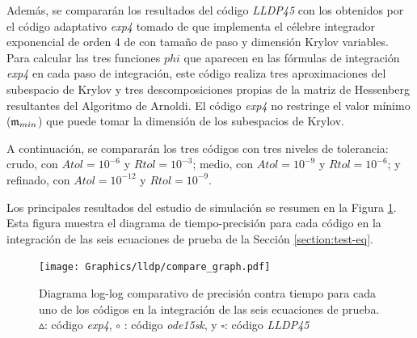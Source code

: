 Además, se compararán los resultados del código \emph{LLDP45} con los obtenidos por el código adaptativo \emph{exp4} tomado de \cite{jansing2011expode} que implementa el célebre integrador exponencial de orden 4 de \cite{hochbruck1998exponential} con tamaño de paso y dimensión Krylov variables. Para calcular las tres funciones $phi$ que aparecen en las fórmulas de integración \emph{exp4} en cada paso de integración, este código realiza tres aproximaciones del subespacio de Krylov y tres descomposiciones propias de la matriz de Hessenberg resultantes del Algoritmo de Arnoldi. El código \emph{exp4} no restringe el
valor mínimo ($\mathfrak{m}_{min}$) que puede tomar la dimensión de los subespacios de Krylov.

A continuación, se compararán los tres códigos con tres niveles de tolerancia: crudo, con $ Atol = 10^{-6}$ y $Rtol = 10^{-3}$; medio, con $Atol = 10^{-9}$ y $Rtol = 10^{-6}$; y refinado, con $ Atol = 10^{-12}$ y $Rtol = 10^{-9}$.

Los principales resultados del estudio de simulación se resumen en la Figura \ref{num-exp-lldp-var-step:Fig1}. Esta figura muestra el diagrama de tiempo-precisión para cada código en la integración de las seis ecuaciones de prueba de la Sección \ref{section:test-eq}.

\begin{figure}
	\begin{center}
    \hspace{-0.5in}
	\texttt{[image: Graphics/lldp/compare\_graph.pdf]}
	\vspace{-0.75in}
	\caption{ Diagrama log-log comparativo de precisión contra tiempo para cada uno de los códigos en la integración de las seis ecuaciones de prueba. $\vartriangle$: código \emph{exp4}, $\circ$ : código \emph{ode15sk}, y $\square$: código \emph{LLDP45}}
	\label{num-exp-lldp-var-step:Fig1}
	\end{center}
\end{figure}

